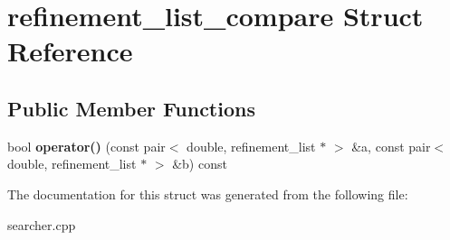 \hypertarget{structrefinement__list__compare}{}\section{refinement\+\_\+list\+\_\+compare Struct Reference}
\label{structrefinement__list__compare}
\subsection*{Public Member Functions}
\begin{DoxyCompactItemize}
\item 
bool {\bfseries operator()} (const pair$<$ double, refinement\+\_\+list $\ast$ $>$ \&a, const pair$<$ double, refinement\+\_\+list $\ast$ $>$ \&b) const \hypertarget{structrefinement__list__compare_a5300444d3954281b9ca3faccff9636de}{}\label{structrefinement__list__compare_a5300444d3954281b9ca3faccff9636de}

\end{DoxyCompactItemize}


The documentation for this struct was generated from the following file\+:\begin{DoxyCompactItemize}
\item 
searcher.\+cpp\end{DoxyCompactItemize}
